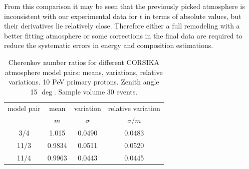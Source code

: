 \documentclass[final,5p,times,twocolumn]{elsarticle}
\begin{document}
From this comparison it may be seen that the previously picked atmosphere is inconsistent with our experimental data for $t$ in terms of absolute values, but their derivatives lie relatively close. Therefore either a full remodeling with a better fitting atmosphere or some corrections in the final data are required to reduce the systematic errors in energy and composition estimations.

\begin{table}[t]
\centering
\caption{Cherenkov number ratios for different CORSIKA atmosphere model pairs: means, variations, relative variations. 10 PeV primary protons. Zenith angle 15 $\deg$. Sample volume 30 events.}
\label{tab:atmmod}
\vspace{1pc}
\begin{tabular}{|c||c|c|c|}
\hline
model pair  & mean &  variation   & relative variation \\ 
            &  $m$ & $\sigma$     & $\sigma/m$          \\ 
\hline 
\hline 
 3/4 &  1.015    &  0.0490     &   0.0483   \\
\hline
11/3 &  0.9834    &  0.0511     &   0.0520    \\
\hline
11/4 &  0.9963    &  0.0443     &   0.0445    \\
\hline
\end{tabular}
\end{table}
\end{document}
